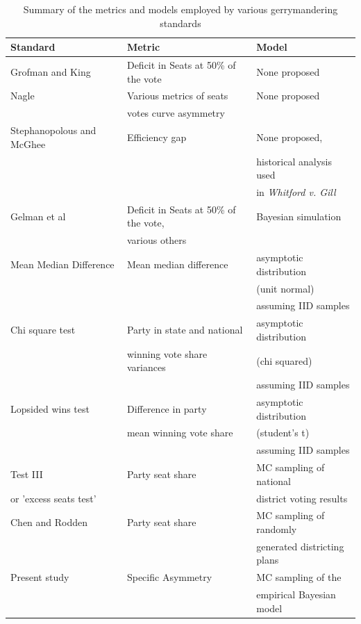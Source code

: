 \documentclass[preprint,12pt]{article}
\begin{document}
\begin{table}[htb!]
\centering
\caption{Summary of the metrics and models employed by various gerrymandering standards \label{tab:Stand}}
\begin{tabular}{|l|l|l|}
\hline
Standard & Metric & Model\\
\hline
\hline
Grofman and King & Deficit in Seats at 50\% of the vote & None proposed\\
\hline
Nagle & Various metrics of seats & None proposed\\
      & votes curve asymmetry &  \\
\hline
Stephanopolous and McGhee & Efficiency gap & None proposed,\\
                          &                & historical analysis used\\
                          &                & in \emph{Whitford v. Gill}\\
\hline
Gelman et al & Deficit in Seats at 50\% of the vote, & Bayesian simulation\\
             & various others & \\
\hline
Mean Median Difference & Mean median difference & asymptotic distribution \\
 &                                              & (unit normal) \\
 &                                              & assuming IID samples \\
\hline
Chi square test & Party in state and national  & asymptotic distribution  \\
                & winning vote share variances  & (chi squared) \\
                &   & assuming IID samples \\
\hline
Lopsided wins test & Difference in party  & asymptotic distribution  \\
                   &  mean winning vote share & (student's t) \\
                   &   & assuming IID samples \\
\hline
Test III \cite{Wang_2016_10.1089/elj.2016.0387} & Party seat share & MC sampling of national \\
or 'excess seats test'         &                  & district voting results\\
\hline
Chen and Rodden & Party seat share & MC sampling of randomly \\
         &                         & generated districting plans\\
\hline
Present study & Specific Asymmetry & MC sampling of the \\
              &                    & empirical Bayesian model\\
\hline
\end{tabular}
\end{table}
\end{document}
